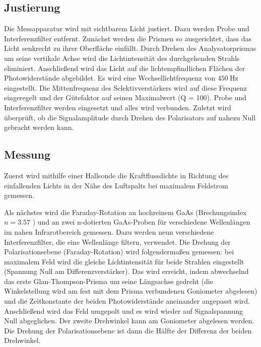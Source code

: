 \subsection{Justierung}
Die Messapparatur wird mit sichtbarem Licht justiert. Dazu werden Probe und Interferenzfilter entfernt.
Zunächst werden die Prismen so ausgerichtet, dass das Licht senkrecht zu ihrer Oberfläche einfällt. Durch Drehen des Analysatorprismas um seine vertikale Achse wird die Lichtintensität des durchgehenden Strahls eliminiert.
Anschließend wird das Licht auf die lichtempfindlichen Flächen der Photowiderstände abgebildet.
Es wird eine Wechsellichtfrequenz von $\SI{450}{\hertz}$ eingestellt. Die Mittenfrequenz des Selektivverstärkers wird auf diese Frequenz eingeregelt und der Gütefaktor auf seinen Maximalwert (Q = 100).
Probe und Interferenzfilter werden eingesetzt und alles wird verbunden. Zuletzt wird überprüft, ob die Signalamplitude durch Drehen des Polarisators auf nahezu Null gebracht werden kann.

\subsection{Messung}
Zuerst wird mithilfe einer Hallsonde die Kraftflussdichte in Richtung des einfallenden Lichts in der Nähe des Luftspalts bei maximalem Feldstrom gemessen.

Als nächstes wird die Faraday-Rotation an hochreinem GaAs (Brechungsindex $n= \num{3.57}$ \cite{chemical}) und an zwei n-dotierten GaAs-Proben für verschiedene Wellenlängen im nahen Infrarotbereich gemessen. Dazu werden neun verschiedene Interferenzfilter, die eine Wellenlänge filtern, verwendet.
Die Drehung der Polarisationsebene (Faraday-Rotation) wird folgendermaßen gemessen: bei maximalem Feld wird die gleiche Lichtintensität für beide Strahlen eingestellt (Spannung Null am Differenzverstärker). Das wird erreicht, indem abwechselnd das erste Glan-Thompson-Prisma um seine Längsachse gedreht (die Winkelstellung wird am fest mit dem Prisma verbundenen Goniometer abgelesen) und die Zeitkonstante der beiden Photowiderstände aneinander angepasst wird. Anschließend wird das Feld umgepolt und es wird wieder auf Signalspannung Null abgeglichen. Der zweite Drehwinkel kann am Goniometer abgelesen werden. Die Drehung der Polarisationsebene ist dann die Hälfte der Differenz der beiden Drehwinkel.